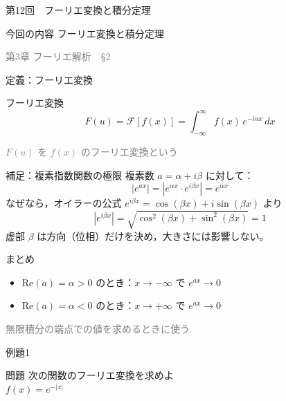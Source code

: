 \documentclass[professionalfonts]{beamer}
\begin{document}
\begin{frame}{第12回　フーリエ変換と積分定理}
  \begin{block}{今回の内容}
  フーリエ変換と積分定理
  \end{block}
  \vfill\hfill{\scriptsize \textcolor{gray}{第3章 フーリエ解析　§2}}
\end{frame}

\begin{frame}{定義：フーリエ変換}
  \begin{block}{フーリエ変換}
  \[
    F(u) = \mathcal{F}[f(x)] = \int_{-\infty}^{\infty} f(x)\,e^{-iux}\,dx
  \]
  \end{block}
  {\footnotesize\textcolor{gray}{$F(u)$ を $f(x)$ のフーリエ変換という}}
\end{frame}

\begin{frame}{補足：複素指数関数の極限}
  複素数 $a = \alpha + i\beta$ に対して：
  \[
    \left|e^{ax}\right| = \left|e^{\alpha x} \cdot e^{i\beta x}\right| = e^{\alpha x}
  \]
  なぜなら，オイラーの公式 $e^{i\beta x} = \cos(\beta x) + i\sin(\beta x)$ より\\[4pt]
  \[
    \left|e^{i\beta x}\right| = \sqrt{\cos^2(\beta x)+\sin^2(\beta x)} = 1
  \]
  虚部 $\beta$ は方向（位相）だけを決め，大きさには影響しない。\\[6pt]
  \begin{block}{まとめ}
  \begin{itemize}
    \item $\mathrm{Re}(a) = \alpha > 0$ のとき：$x \to -\infty$ で $e^{ax} \to 0$
    \item $\mathrm{Re}(a) = \alpha < 0$ のとき：$x \to +\infty$ で $e^{ax} \to 0$
  \end{itemize}
  \end{block}
  {\footnotesize\textcolor{gray}{無限積分の端点での値を求めるときに使う}}
\end{frame}

\begin{frame}{例題1　}
  \begin{exampleblock}{問題}
    次の関数のフーリエ変換を求めよ\\[2pt]
    $f(x) = e^{-|x|}$\\[2pt]
  \end{exampleblock}
\end{frame}
\end{document}
